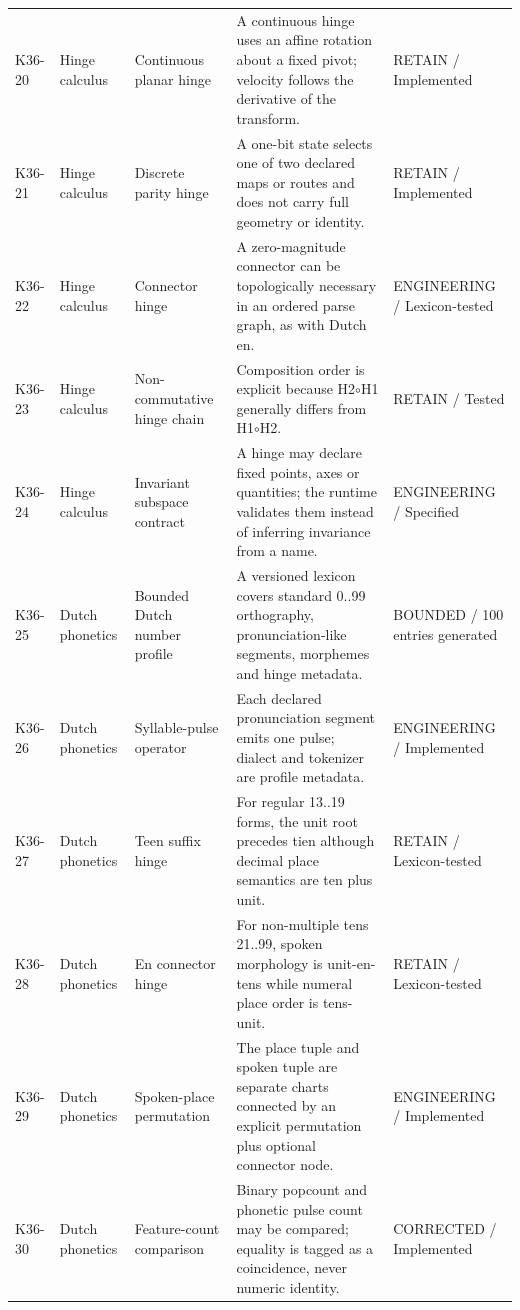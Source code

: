 \begin{longtable}{>{\raggedright\arraybackslash}p{1.0cm}>{\raggedright\arraybackslash}p{2.4cm}>{\raggedright\arraybackslash}p{3.2cm}>{\raggedright\arraybackslash}p{7.1cm}>{\raggedright\arraybackslash}p{2.3cm}}
\addlinespace[1.5pt]
K36-20 & Hinge calculus & Continuous planar hinge & A continuous hinge uses an affine rotation about a fixed pivot; velocity follows the derivative of the transform. & RETAIN / Implemented \\
\addlinespace[1.5pt]
K36-21 & Hinge calculus & Discrete parity hinge & A one-bit state selects one of two declared maps or routes and does not carry full geometry or identity. & RETAIN / Implemented \\
\addlinespace[1.5pt]
K36-22 & Hinge calculus & Connector hinge & A zero-magnitude connector can be topologically necessary in an ordered parse graph, as with Dutch en. & ENGINEERING / Lexicon-tested \\
\addlinespace[1.5pt]
K36-23 & Hinge calculus & Non-commutative hinge chain & Composition order is explicit because H2$\circ$H1 generally differs from H1$\circ$H2. & RETAIN / Tested \\
\addlinespace[1.5pt]
K36-24 & Hinge calculus & Invariant subspace contract & A hinge may declare fixed points, axes or quantities; the runtime validates them instead of inferring invariance from a name. & ENGINEERING / Specified \\
\addlinespace[1.5pt]
K36-25 & Dutch phonetics & Bounded Dutch number profile & A versioned lexicon covers standard 0..99 orthography, pronunciation-like segments, morphemes and hinge metadata. & BOUNDED / 100 entries generated \\
\addlinespace[1.5pt]
K36-26 & Dutch phonetics & Syllable-pulse operator & Each declared pronunciation segment emits one pulse; dialect and tokenizer are profile metadata. & ENGINEERING / Implemented \\
\addlinespace[1.5pt]
K36-27 & Dutch phonetics & Teen suffix hinge & For regular 13..19 forms, the unit root precedes tien although decimal place semantics are ten plus unit. & RETAIN / Lexicon-tested \\
\addlinespace[1.5pt]
K36-28 & Dutch phonetics & En connector hinge & For non-multiple tens 21..99, spoken morphology is unit-en-tens while numeral place order is tens-unit. & RETAIN / Lexicon-tested \\
\addlinespace[1.5pt]
K36-29 & Dutch phonetics & Spoken-place permutation & The place tuple and spoken tuple are separate charts connected by an explicit permutation plus optional connector node. & ENGINEERING / Implemented \\
\addlinespace[1.5pt]
K36-30 & Dutch phonetics & Feature-count comparison & Binary popcount and phonetic pulse count may be compared; equality is tagged as a coincidence, never numeric identity. & CORRECTED / Implemented \\

\end{longtable}
